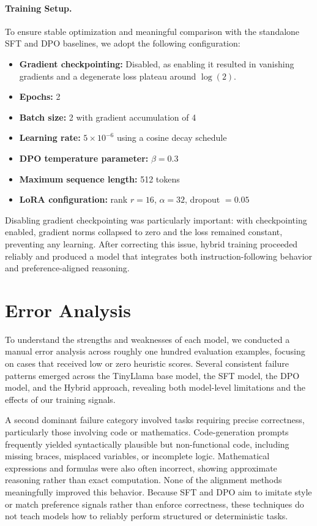 \documentclass[11pt,a4paper]{article}
\begin{document}
\paragraph{Training Setup.}
To ensure stable optimization and meaningful comparison with the standalone SFT and DPO baselines, we adopt the following configuration:
\begin{itemize}
    \item \textbf{Gradient checkpointing:} Disabled, as enabling it resulted in vanishing gradients and a degenerate loss plateau around $\log(2)$.
    \item \textbf{Epochs:} 2
    \item \textbf{Batch size:} 2 with gradient accumulation of 4
    \item \textbf{Learning rate:} $5 \times 10^{-6}$ using a cosine decay schedule
    \item \textbf{DPO temperature parameter:} $\beta = 0.3$
    \item \textbf{Maximum sequence length:} 512 tokens
    \item \textbf{LoRA configuration:} rank $r = 16$, $\alpha = 32$, dropout $= 0.05$
\end{itemize}

Disabling gradient checkpointing was particularly important: with checkpointing enabled, gradient norms collapsed to zero and the loss remained constant, preventing any learning. After correcting this issue, hybrid training proceeded reliably and produced a model that integrates both instruction-following behavior and preference-aligned reasoning.

\section{Error Analysis}

To understand the strengths and weaknesses of each model, we conducted a manual error analysis across roughly one hundred evaluation examples, focusing on cases that received low or zero heuristic scores. Several consistent failure patterns emerged across the TinyLlama base model, the SFT model, the DPO model, and the Hybrid approach, revealing both model-level limitations and the effects of our training signals.

A second dominant failure category involved tasks requiring precise correctness, particularly those involving code or mathematics. Code-generation prompts frequently yielded syntactically plausible but non-functional code, including missing braces, misplaced variables, or incomplete logic. Mathematical expressions and formulas were also often incorrect, showing approximate reasoning rather than exact computation. None of the alignment methods meaningfully improved this behavior. Because SFT and DPO aim to imitate style or match preference signals rather than enforce correctness, these techniques do not teach models how to reliably perform structured or deterministic tasks.
\end{document}

